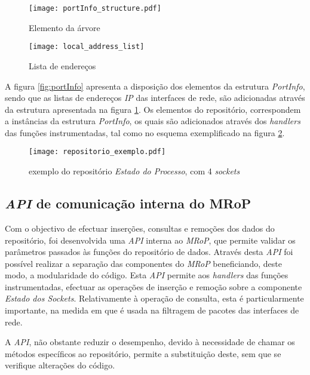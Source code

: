 \begin{figure}[ht]
\begin{minipage}[b]{0.5\linewidth}
\centering
\texttt{[image: portInfo\_structure.pdf]}
\caption{Elemento da árvore}
\label{fig:portInfo}
\end{minipage}
\hspace{0.5cm}
\begin{minipage}[b]{0.5\linewidth}
\centering
\texttt{[image: local\_address\_list]}
\caption{Lista de endereços}
\label{fig:local_address_list}
\end{minipage}
\end{figure}

A figura \ref{fig:portInfo} apresenta a disposição dos elementos da estrutura \textit{PortInfo}, sendo que as listas de endereços \textit{IP} das interfaces de rede, são adicionadas através da estrutura apresentada na figura \ref{fig:local_address_list}.
Os elementos do repositório, correspondem a instâncias da estrutura \textit{PortInfo}, os quais são adicionados através dos \textit{handlers} das funções instrumentadas, tal como no esquema exemplificado na figura \ref{fig:repo_example}.

\begin{figure}[!htbp]
\centering
\texttt{[image: repositorio\_exemplo.pdf]}
\caption{exemplo do repositório \textit{Estado do Processo}, com 4 \textit{sockets}}
\label{fig:repo_example}
\end{figure}

\subsection{\textit{API} de comunicação interna do MRoP}
\label{sub:repo_api}

Com o objectivo de efectuar inserções, consultas e remoções dos dados do repositório, foi desenvolvida uma \textit{API} interna ao \textit{MRoP}, que permite validar os parâmetros passados às funções do repositório de dados.
Através desta \textit{API} foi possível realizar a separação das componentes do \textit{MRoP} beneficiando, deste modo, a modularidade do código.
Esta \textit{API} permite aos \textit{handlers} das funções instrumentadas, efectuar as operações de inserção e remoção sobre a componente \textit{Estado dos Sockets}.
Relativamente à operação de consulta, esta é particularmente importante, na medida em que é usada na filtragem de pacotes das interfaces de rede.

A \textit{API}, não obstante reduzir o desempenho, devido à necessidade de chamar os métodos específicos ao repositório, permite a substituição deste, sem que se verifique alterações do código.

